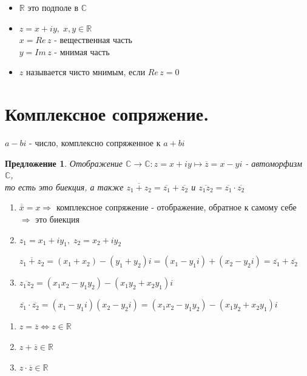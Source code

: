 \documentclass[12pt,letterpaper]{report}
\makeatletter
\newtheorem*{theorem-non}{Предложение}
\theoremstyle{definition}
\renewenvironment{proof}[1][\proofname]{%
   \par\pushQED{\qed}\normalfont%
   \topsep6\p@\@plus6\p@\relax
   \trivlist\item[\hskip\labelsep\bfseries#1\@addpunct{.}]%
   \ignorespaces
}{%
   \popQED\endtrivlist\@endpefalse
}
\makeatother
\begin{document}
\begin{itemize}
  \item $\mathbb{R}$ это подполе в $\mathbb{C}$ 
  \item $z = x + iy,\; x, y \in \mathbb{R}$ \\
  $x = Re\,z$ - вещественная часть \\
  $y = Im\,z$ - мнимая часть
  \item $z$ называется чисто мнимым, если $Re\,z = 0$
\end{itemize}

\section{Комплексное сопряжение.}
$a - bi$ - число, комплексно сопряженное к $a + bi$
\begin{theorem-non}
  Отображение $\mathbb{C} \to \mathbb{C} : z = x + iy \mapsto \overline{z} = x - yi$ - автоморфизм $\mathbb{C}$, \\
  то есть это биекция, а также $\overline{z_1 + z_2} = \overline{z_1} + \overline{z_2}$ и $\overline{z_1z_2} = \overline{z_1} \cdot \overline{z_2}$
\end{theorem-non}
\begin{proof}
  \begin{enumerate}
    \item $\overline{\overline{x}} = x \Rightarrow$ комплексное сопряжение - отображение, обратное к самому себе $\Rightarrow$ это биекция
    \item  $z_1 = x_1 + iy_1,\; z_2 = x_2 + iy_2$ 
    
    $\overline{z_1 + z_2} = (x_1 + x_2) - (y_1 + y_2)i = (x_1 - y_1i) + (x_2 - y_2i) = \overline{z_1} + \overline{z_2}$
    \item $\overline{z_1z_2} = (x_1x_2 - y_1y_2) - (x_1y_2 + x_2y_1)i$
    
    $\overline{z_1} \cdot \overline{z_2} = (x_1 - y_1i)(x_2 - y_2i) = (x_1x_2 - y_1y_2) - (x_1y_2 + x_2y_1)i$
  \end{enumerate}
\end{proof}
\begin{notice}
  \begin{enumerate}
    \item $z = \overline{z} \Leftrightarrow z \in \mathbb{R}$
    \item $z + \overline{z} \in \mathbb{R}$
    \item $z \cdot \overline{z} \in \mathbb{R}$
  \end{enumerate}
\end{notice}
\end{document}
